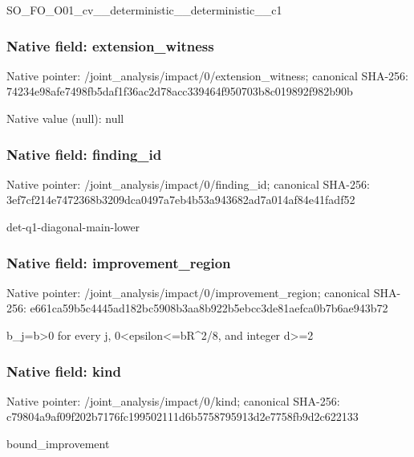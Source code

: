 \documentclass[10pt,a4paper]{article}
\begin{document}
\begingroup\raggedright\sloppy SO\_\allowbreak{}FO\_\allowbreak{}O01\_\allowbreak{}cv\_\allowbreak{}\_\allowbreak{}deterministic\_\allowbreak{}\_\allowbreak{}deterministic\_\allowbreak{}\_\allowbreak{}c1\par\endgroup

\subsubsection{Native field: extension\_\allowbreak{}witness}
Native pointer: /joint\_\allowbreak{}analysis/impact/0/extension\_\allowbreak{}witness; canonical SHA-256: 74234e98afe7498fb5daf1f36ac2d78acc339464f950703b8c019892f982b90b

Native value (null): null

\subsubsection{Native field: finding\_\allowbreak{}id}
Native pointer: /joint\_\allowbreak{}analysis/impact/0/finding\_\allowbreak{}id; canonical SHA-256: 3ef7cf214e7472368b3209dca0497a7eb4b53a943682ad7a014af84e41fadf52

\begingroup\raggedright\sloppy det-q1-diagonal-main-lower\par\endgroup

\subsubsection{Native field: improvement\_\allowbreak{}region}
Native pointer: /joint\_\allowbreak{}analysis/impact/0/improvement\_\allowbreak{}region; canonical SHA-256: e661ca59b5c4445ad182bc5908b3aa8b922b5ebcc3de81aefca0b7b6ae943b72

\begingroup\raggedright\sloppy b\_\allowbreak{}j=\allowbreak{}b>0 for every j,\allowbreak{} 0<epsilon<=\allowbreak{}bR\textasciicircum{}2/\allowbreak{}8,\allowbreak{} and integer d>=\allowbreak{}2\par\endgroup

\subsubsection{Native field: kind}
Native pointer: /joint\_\allowbreak{}analysis/impact/0/kind; canonical SHA-256: c79804a9af09f202b7176fc199502111d6b5758795913d2e7758fb9d2c622133

\begingroup\raggedright\sloppy bound\_\allowbreak{}improvement\par\endgroup
\end{document}
